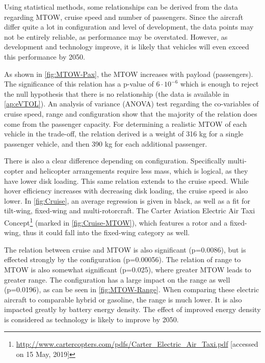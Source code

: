 Using statistical methods, some relationships can be derived from the data regarding MTOW, cruise speed and number of passengers. Since the aircraft differ quite a lot in configuration and level of development, the data points may not be entirely reliable, as performance may be overstated. However, as development and technology improve, it is likely that vehicles will even exceed this performance by 2050.

As shown in \autoref{fig:MTOW-Pax}, the MTOW increases with payload (passengers). The significance of this relation has a p-value of $6\cdot10^{-6}$ which is enough to reject the null hypothesis that there is no relationship (the data is available in \autoref{ap:eVTOL}). An analysis of variance (ANOVA) test regarding the co-variables of cruise speed, range and configuration show that the majority of the relation does come from the passenger capacity. For determining a realistic MTOW of each vehicle in the trade-off, the relation derived is a weight of 316 kg for a single passenger vehicle, and then 390 kg for each additional passenger.

There is also a clear difference depending on configuration. Specifically multi-copter and helicopter  arrangements require less mass, which is logical, as they have lower disk loading. This same relation extends to the cruise speed. While hover efficiency increases with decreasing disk loading, the cruise speed is also lower. In \autoref{fig:Cruise}, an average regression is given in black, as well as a fit for tilt-wing, fixed-wing and multi-rotorcraft. %
The Carter Aviation Electric Air Taxi Concept\footnote{\url{http://www.cartercopters.com/pdfs/Carter_Electric_Air_Taxi.pdf} [accessed on 15 May, 2019]} (marked in \autoref{fig:Cruise-MTOW}), which features a rotor and a fixed-wing, thus it could fall into the fixed-wing category as well.

The relation between cruise and MTOW is also significant (p=0.0086), but is effected strongly by the configuration (p=0.00056). The relation of range to MTOW is also somewhat significant (p=0.025), where greater MTOW leads to greater range. The configuration has a large impact on the range as well (p=0.0196), as can be seen in \autoref{fig:MTOW-Range}. When comparing these electric aircraft to comparable hybrid or gasoline, the range is much lower. It is also impacted greatly by battery energy density. The effect of improved energy density is considered as technology is likely to improve by 2050.

